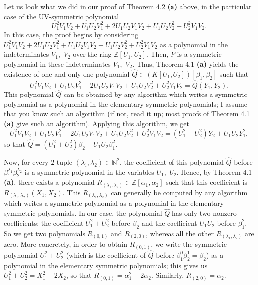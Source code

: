 \documentclass[numbers=enddot,12pt,final,onecolumn,notitlepage]{scrartcl}%
\begin{document}
Let us look what we did in our proof of Theorem 4.2 \textbf{(a)} above, in the
particular case of the UV-symmetric polynomial
\[
U_{1}^{2}V_{1}V_{2}+U_{1}U_{2}V_{1}^{2}+2U_{1}U_{2}V_{1}V_{2}+U_{1}U_{2}%
V_{2}^{2}+U_{2}^{2}V_{1}V_{2}.
\]
In this case, the proof begins by considering $U_{1}^{2}V_{1}V_{2}+2U_{1}%
U_{2}V_{1}^{2}+U_{1}U_{2}V_{1}V_{2}+U_{1}U_{2}V_{2}^{2}+U_{2}^{2}V_{1}V_{2}$
as a polynomial in the indeterminates $V_{1},$ $V_{2}$ over the ring
$\mathbb{Z}\left[  U_{1},U_{2}\right]  $. Then, $P$ is a symmetric polynomial
in these indeterminates $V_{1},$ $V_{2}$. Thus, Theorem 4.1 \textbf{(a)}
yields the existence of one and only one polynomial $\widehat{Q}\in\left(
K\left[  U_{1},U_{2}\right]  \right)  \left[  \beta_{1},\beta_{2}\right]  $
such that%
\[
U_{1}^{2}V_{1}V_{2}+U_{1}U_{2}V_{1}^{2}+2U_{1}U_{2}V_{1}V_{2}+U_{1}U_{2}%
V_{2}^{2}+U_{2}^{2}V_{1}V_{2}=\widehat{Q}\left(  Y_{1},Y_{2}\right)  .
\]
This polynomial $\widehat{Q}$ can be obtained by any algorithm which writes a
symmetric polynomial as a polynomial in the elementary symmetric polynomials;
I assume that you know such an algorithm (if not, read it up; most proofs of
Theorem 4.1 \textbf{(a)} give such an algorithm). Applying this algorithm, we
get
\[
U_{1}^{2}V_{1}V_{2}+U_{1}U_{2}V_{1}^{2}+2U_{1}U_{2}V_{1}V_{2}+U_{1}U_{2}%
V_{2}^{2}+U_{2}^{2}V_{1}V_{2}=\left(  U_{1}^{2}+U_{2}^{2}\right)  Y_{2}%
+U_{1}U_{2}Y_{1}^{2},
\]
so that $\widehat{Q}=\left(  U_{1}^{2}+U_{2}^{2}\right)  \beta_{2}+U_{1}%
U_{2}\beta_{1}^{2}$.

Now, for every $2$-tuple $\left(  \lambda_{1},\lambda_{2}\right)
\in\mathbb{N}^{2}$, the coefficient of this polynomial $\widehat{Q}$ before
$\beta_{1}^{\lambda_{1}}\beta_{2}^{\lambda_{2}}$ is a symmetric polynomial in
the variables $U_{1},$ $U_{2}$. Hence, by Theorem 4.1 \textbf{(a)}, there
exists a polynomial $R_{\left(  \lambda_{1},\lambda_{2}\right)  }\in
\mathbb{Z}\left[  \alpha_{1},\alpha_{2}\right]  $ such that this coefficient
is $R_{\left(  \lambda_{1},\lambda_{2}\right)  }\left(  X_{1},X_{2}\right)  $.
This $R_{\left(  \lambda_{1},\lambda_{2}\right)  }$ can generally be computed
by any algorithm which writes a symmetric polynomial as a polynomial in the
elementary symmetric polynomials. In our case, the polynomial $\widehat{Q}$
has only two nonzero coefficients: the coefficient $U_{1}^{2}+U_{2}^{2}$
before $\beta_{2}$ and the coefficient $U_{1}U_{2}$ before $\beta_{1}^{2}$. So
we get two polynomials $R_{\left(  0,1\right)  }$ and $R_{\left(  2,0\right)
}$, whereas all the other $R_{\left(  \lambda_{1},\lambda_{2}\right)  }$ are
zero. More concretely, in order to obtain $R_{\left(  0,1\right)  }$, we write
the symmetric polynomial $U_{1}^{2}+U_{2}^{2}$ (which is the coefficient of
$\widehat{Q}$ before $\beta_{1}^{0}\beta_{2}^{1}=\beta_{2}$) as a polynomial
in the elementary symmetric polynomials; this gives us $U_{1}^{2}+U_{2}%
^{2}=X_{1}^{2}-2X_{2}$, so that $R_{\left(  0,1\right)  }=\alpha_{1}%
^{2}-2\alpha_{2}$. Similarly, $R_{\left(  2,0\right)  }=\alpha_{2}$.
\end{document}
